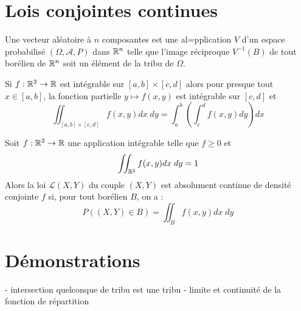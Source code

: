 


\section*{Lois conjointes continues}

\begin{definition}
    Une vecteur aléatoire à $n$ composantes est une al=pplication $V$ d'un espace probabilisé $(\Omega, \mathcal{A}, P)$ dans $\mathbb{R}^n$ telle que l'image réciproque $V^{-1}(B)$ de tout borélien de $\mathbb{R}^n$ soit un élément de la tribu de $\Omega$.
\end{definition}

\begin{theorem}[Fubini]
    Si $ f : \mathbb{R}^2 \rightarrow \mathbb{R} $ est intégrable sur $[a, b] \times [c, d]$ alors pour presque tout $x \in [a, b]$, la fonction partielle $ y \mapsto f(x, y)$ est intégrable sur $[c, d]$ et 
        \[ \iint_{[a, b] \times [c, d]} f(x, y) dx \; dy = \int_{a}^{b} \left( \int_{c}^{d} f(x, y) dy \right) dx \]
\end{theorem}

\begin{definition}
    Soit $ f : \mathbb{R}^2 \rightarrow \mathbb{R} $ une application intégrable telle que $f \geq 0$ et 
        \[ \iint_{\mathbb{R}^2} f(x, y) dx \; dy = 1 \]
    Alors la loi $\mathcal{L}(X, Y)$ du couple $(X, Y)$ est absolument continue de densité conjointe $f$ si, pour tout borélien $B$, on a :
        \[ P((X, Y) \in B) = \iint_B f(x, y) dx \; dy \]
\end{definition}











\section*{Démonstrations}

- intersection quelconque de tribu est une tribu
- limite et continuité de la fonction de répartition



